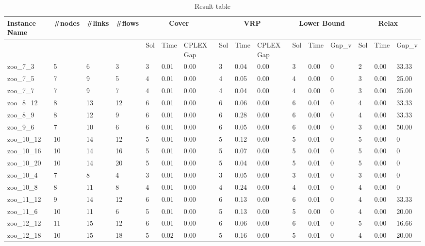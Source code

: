 \begin{landscape}
\begin{longtable}{llllllllllllllll}
\caption{Result table}
\hline
Instance Name & \#nodes & \#links & \#flows & \multicolumn{3}{c|}{Cover} & \multicolumn{3}{c|}{VRP} & \multicolumn{3}{c|}{Lower Bound} & \multicolumn{3}{c|}{Relax} \\ \hline
& & & & Sol & Time & CPLEX Gap & Sol & Time & CPLEX Gap & Sol & Time & Gap_v & Sol & Time & Gap_v \\ \hline
zoo\_7\_3 & 5 & 6 & 3 & 3 & 0.01 & 0.00 & 3 & 0.04 & 0.00 & 3 & 0.00 & 0 & 2 & 0.00 & 33.33 \\ \hline 
zoo\_7\_5 & 7 & 9 & 5 & 4 & 0.01 & 0.00 & 4 & 0.05 & 0.00 & 4 & 0.00 & 0 & 3 & 0.00 & 25.00 \\ \hline 
zoo\_7\_7 & 7 & 9 & 7 & 4 & 0.01 & 0.00 & 4 & 0.04 & 0.00 & 4 & 0.00 & 0 & 3 & 0.00 & 25.00 \\ \hline 
zoo\_8\_12 & 8 & 13 & 12 & 6 & 0.01 & 0.00 & 6 & 0.06 & 0.00 & 6 & 0.01 & 0 & 4 & 0.00 & 33.33 \\ \hline 
zoo\_8\_9 & 8 & 12 & 9 & 6 & 0.01 & 0.00 & 6 & 0.28 & 0.00 & 6 & 0.00 & 0 & 4 & 0.00 & 33.33 \\ \hline 
zoo\_9\_6 & 7 & 10 & 6 & 6 & 0.01 & 0.00 & 6 & 0.05 & 0.00 & 6 & 0.00 & 0 & 3 & 0.00 & 50.00 \\ \hline 
zoo\_10\_12 & 10 & 14 & 12 & 5 & 0.01 & 0.00 & 5 & 0.12 & 0.00 & 5 & 0.01 & 0 & 5 & 0.00 & 0 \\ \hline 
zoo\_10\_16 & 10 & 14 & 16 & 5 & 0.01 & 0.00 & 5 & 0.07 & 0.00 & 5 & 0.01 & 0 & 5 & 0.00 & 0 \\ \hline 
zoo\_10\_20 & 10 & 14 & 20 & 5 & 0.01 & 0.00 & 5 & 0.04 & 0.00 & 5 & 0.01 & 0 & 5 & 0.00 & 0 \\ \hline 
zoo\_10\_4 & 7 & 8 & 4 & 3 & 0.01 & 0.00 & 3 & 0.05 & 0.00 & 3 & 0.01 & 0 & 3 & 0.00 & 0 \\ \hline 
zoo\_10\_8 & 8 & 11 & 8 & 4 & 0.01 & 0.00 & 4 & 0.24 & 0.00 & 4 & 0.01 & 0 & 4 & 0.00 & 0 \\ \hline 
zoo\_11\_12 & 9 & 14 & 12 & 6 & 0.01 & 0.00 & 6 & 0.13 & 0.00 & 6 & 0.01 & 0 & 4 & 0.00 & 33.33 \\ \hline 
zoo\_11\_6 & 10 & 11 & 6 & 5 & 0.01 & 0.00 & 5 & 0.13 & 0.00 & 5 & 0.00 & 0 & 4 & 0.00 & 20.00 \\ \hline 
zoo\_12\_12 & 11 & 15 & 12 & 6 & 0.01 & 0.00 & 6 & 0.06 & 0.00 & 6 & 0.01 & 0 & 5 & 0.00 & 16.66 \\ \hline 
zoo\_12\_18 & 10 & 15 & 18 & 5 & 0.02 & 0.00 & 5 & 0.16 & 0.00 & 5 & 0.01 & 0 & 4 & 0.00 & 20.00 \\ \hline 

\end{longtable}
\end{landscape}
